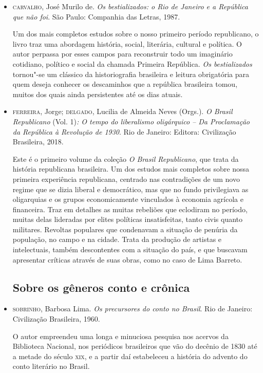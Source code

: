 \documentclass[11pt]{extarticle}
\begin{document}
\begin{itemize}
\item  \textsc{carvalho}, José Murilo de. \emph{Os bestializados: o Rio de Janeiro e a
República que não foi}. São Paulo: Companhia das Letras, 1987. 

Um dos
mais completos estudos sobre o nosso primeiro período republicano, o
livro traz uma abordagem história, social, literária, cultural e
política. O autor perpassa por esses campos para reconstruir todo um
imaginário cotidiano, político e social da chamada Primeira República.
\emph{Os bestializados} tornou"-se um clássico da historiografia
brasileira e leitura obrigatória para quem deseja conhecer os
descaminhos que a república brasileira tomou, muitos dos quais ainda
persistentes até os dias atuais.

\item  \textsc{ferreira}, Jorge; \textsc{delgado}, Lucilia de Almeida Neves (Orgs.). \emph{O
Brasil Republicano} (Vol. 1)\emph{: O tempo do liberalismo oligárquico
-- Da Proclamação da República à Revolução de 1930}. Rio de Janeiro:
Editora: Civilização Brasileira, 2018. 

Este é o primeiro volume da
coleção \emph{O Brasil Republicano}, que trata da história republicana
brasileira. Um dos estudos mais completos sobre nossa primeira
experiência republicana, centrado nas contradições de um novo regime que
se dizia liberal e democrático, mas que no fundo privilegiava as
oligarquias e os grupos economicamente vinculados à economia agrícola e
financeira. Traz em detalhes as muitas rebeliões que eclodiram no
período, muitas delas lideradas por elites políticas insatisfeitas,
tanto civis quanto militares. Revoltas populares que condenavam a
situação de penúria da população, no campo e na cidade. Trata da
produção de artistas e intelectuais, também descontentes com a situação
do país, e que buscavam apresentar críticas através de suas obras, como
no caso de Lima Barreto.

\subsection{Sobre os gêneros conto e crônica}

\item \textsc{sobrinho}, Barbosa Lima. \emph{Os precursores do conto no Brasil}. Rio de
Janeiro: Civilização Brasileira, 1960. 

O autor empreendeu uma longa e
minuciosa pesquisa nos acervos da Biblioteca Nacional, nos periódicos
brasileiros que vão do decênio de 1830 até a metade do século \textsc{xix}, e a
partir daí estabeleceu a história do advento do conto literário no
Brasil.


\end{itemize}
\end{document}
